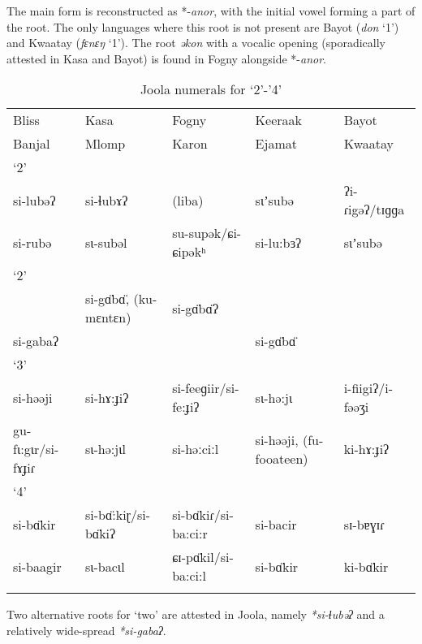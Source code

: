 The main form is reconstructed as *-\textit{anor}, with the initial vowel forming a part of the root. The only languages where this root is not present are Bayot (\textit{don} ‘1’) and Kwaatay (\textit{fɛnɛŋ} ‘1’). The root \textit{əkon} with a vocalic opening (sporadically attested in Kasa and Bayot) is found in Fogny alongside *-\textit{anor}.


\begin{table}
\caption{\label{tab:3:235}Joola numerals for `2'-'4'}


\begin{tabularx}{\textwidth}{lQQQQ}
\lsptoprule

Bliss & Kasa & Fogny & Keeraak & Bayot\\
Banjal & Mlomp & Karon & Ejamat & Kwaatay\\
\midrule
{{‘2’}} & {} & {} & {} & {}\\
\midrule
si-lubəʔ & si-ɬubɤʔ & (liba) & sɩʼsubə & ʔi-ɾigəʔ/tɪɡɡa\\
si-rubə & sɩ-subəl & su-supək/ɕi-ɕipəkʰ & si-lu:bɜʔ & sɩʼsubə\\
\tablevspace
{{‘2}{’}} & {} & {} & {} & {}\\
\midrule
~ & si-g{\"{ɑ}}b{\"{ɑ}}, (ku-mɛntɛn) & si-g{\"{ɑ}}b{\"{ɑ}}ʔ &  & \\
si-gabaʔ &  &  & si-g{\"{ɑ}}b{\"{ɑ}} & \\
\tablevspace
{{‘3}{’}} & {} & {} & {} & {}\\
\midrule
si-həəji & si-hɤ:ɟiʔ & si-feeɡiir/si-fe:ɟiʔ & sɩ-hə:jɩ & i-fiigiʔ/i-fəəʒi\\
gu-fɩ:gɩr/si-fɤɟiɾ & sɩ-hə:jɩl & si-həːciːl & si-həəji, (fu-fooateen) & ki-hɤ:ɟiʔ\\
\tablevspace
{{‘4}{’}} & {} & {} & {} & {}\\
\midrule
si-b{\"{ɑ}}kir & si-b{\"{ɑ}}:kiɽ/si-b{\"{ɑ}}kiʔ & si-b{\"{ɑ}}kiɾ/si-ba:ci:r & si-bacir & sɪ-bɐɣɪɾ \\
si-baagir & sɩ-bacɩl & ɕɪ-p{\"{ɑ}}kil/si-ba:ci:l & si-b{\"{ɑ}}kir & ki-b{\"{ɑ}}kir\\
\lspbottomrule
\end{tabularx}
\end{table}

Two alternative roots for ‘two’ are attested in Joola, namely \textit{*si-ɬubəʔ} and a relatively wide-spread \textit{*si-gabaʔ}.

